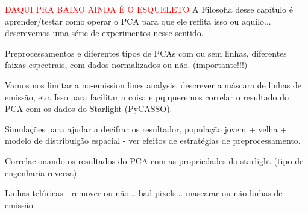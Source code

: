 \textcolor{red}{DAQUI PRA BAIXO AINDA É O ESQUELETO}
\ojo A Filosofia desse capítulo é aprender/testar como operar o PCA para que ele
reflita isso ou aquilo... descrevemos uma série de experimentos nesse sentido.

Preprocessamentos e diferentes tipos de PCAs com ou sem linhas, diferentes
faixas espectrais, com dados normalizados ou não. (importante!!!)

Vamos nos limitar a no-emission lines analysis, descrever a máscara de linhas de
emissão, etc. Isso para facilitar a coisa e pq queremos correlar o resultado do
PCA com os dados do Starlight (PyCASSO).

Simulações para ajudar a decifrar os resultador, população jovem + velha +
modelo de distribuição espacial - ver efeitos de estratégias de
preprocessamento.

Correlacionando os resultados do PCA com as propriedades do starlight (tipo de
engenharia reversa)

Linhas telúricas - remover ou não... bad pixels... mascarar ou não linhas de
emissão